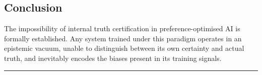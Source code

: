 \documentclass{article}
\begin{document}
\subsection{Conclusion}
The impossibility of internal truth certification in preference-optimised AI is formally established. Any system trained under this paradigm operates in an epistemic vacuum, unable to distinguish between its own certainty and actual truth, and inevitably encodes the biases present in its training signals.

\vspace{1cm}
\hrule
\vspace{0.5cm}
\end{document}
